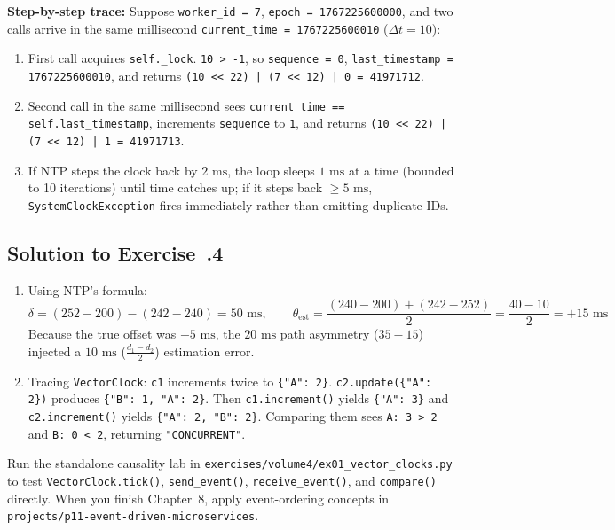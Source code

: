 \textbf{Step-by-step trace:} Suppose \texttt{worker\_id = 7}, \texttt{epoch = 1767225600000}, and two calls arrive in the same millisecond \texttt{current\_time = 1767225600010} ($\Delta t = 10$):
\begin{enumerate}[leftmargin=18pt]
  \item First call acquires \texttt{self.\_lock}. \texttt{10 > -1}, so \texttt{sequence = 0}, \texttt{last\_timestamp = 1767225600010}, and returns \texttt{(10 << 22) | (7 << 12) | 0 = 41971712}.
  \item Second call in the same millisecond sees \texttt{current\_time == self.last\_timestamp}, increments \texttt{sequence} to \texttt{1}, and returns \texttt{(10 << 22) | (7 << 12) | 1 = 41971713}.
  \item If NTP steps the clock back by $2\text{ ms}$, the loop sleeps $1\text{ ms}$ at a time (bounded to 10 iterations) until time catches up; if it steps back $\ge 5\text{ ms}$, \texttt{SystemClockException} fires immediately rather than emitting duplicate IDs.
\end{enumerate}

\subsection*{Solution to Exercise~\thechapter.4}
\begin{enumerate}[leftmargin=18pt]
  \item Using NTP's formula:
  \[
  \delta = (252 - 200) - (242 - 240) = 50\text{ ms}, \qquad
  \theta_{\text{est}} = \frac{(240 - 200) + (242 - 252)}{2} = \frac{40 - 10}{2} = +15\text{ ms}
  \]
  Because the true offset was $+5\text{ ms}$, the $20\text{ ms}$ path asymmetry ($35 - 15$) injected a $10\text{ ms}$ ($\frac{d_1 - d_2}{2}$) estimation error.
  \item Tracing \texttt{VectorClock}: \texttt{c1} increments twice to \texttt{\{"A": 2\}}. \texttt{c2.update(\{"A": 2\})} produces \texttt{\{"B": 1, "A": 2\}}. Then \texttt{c1.increment()} yields \texttt{\{"A": 3\}} and \texttt{c2.increment()} yields \texttt{\{"A": 2, "B": 2\}}. Comparing them sees \texttt{A: 3 > 2} and \texttt{B: 0 < 2}, returning \texttt{"CONCURRENT"}.
\end{enumerate}

\begin{labbridgebox}
Run the standalone causality lab in \texttt{exercises/volume4/ex01\_vector\_clocks.py} to test \texttt{VectorClock.tick()}, \texttt{send\_event()}, \texttt{receive\_event()}, and \texttt{compare()} directly. When you finish Chapter~8, apply event-ordering concepts in \texttt{projects/p11-event-driven-microservices}.
\end{labbridgebox}


